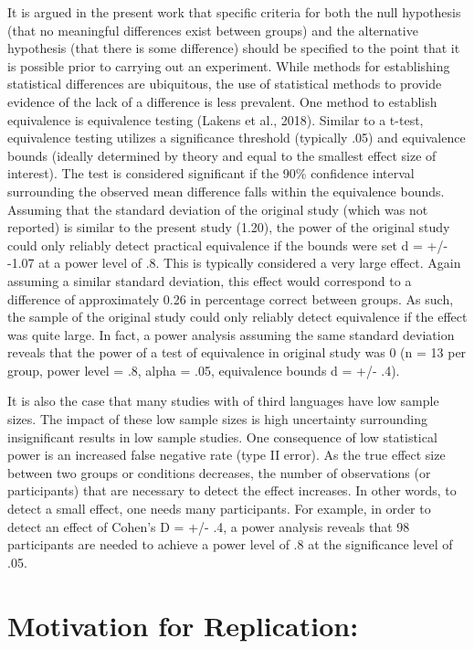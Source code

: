 \documentclass[
  man,floatsintext]{apa6}
\begin{document}
It is argued in the present work that specific criteria for both the null hypothesis (that no meaningful differences exist between groups) and the alternative hypothesis (that there is some difference) should be specified to the point that it is possible prior to carrying out an experiment.
While methods for establishing statistical differences are ubiquitous, the use of statistical methods to provide evidence of the lack of a difference is less prevalent.
One method to establish equivalence is equivalence testing (Lakens et al., 2018).
Similar to a t-test, equivalence testing utilizes a significance threshold (typically .05) and equivalence bounds (ideally determined by theory and equal to the smallest effect size of interest).
The test is considered significant if the 90\% confidence interval surrounding the observed mean difference falls within the equivalence bounds.
Assuming that the standard deviation of the original study (which was not reported) is similar to the present study (1.20), the power of the original study could only reliably detect practical equivalence if the bounds were set d = +/- -1.07 at a power level of .8.
This is typically considered a very large effect.
Again assuming a similar standard deviation, this effect would correspond to a difference of approximately 0.26 in percentage correct between groups.
As such, the sample of the original study could only reliably detect equivalence if the effect was quite large.
In fact, a power analysis assuming the same standard deviation reveals that the power of a test of equivalence in original study was 0 (n = 13 per group, power level = .8, alpha = .05, equivalence bounds d = +/- .4).

It is also the case that many studies with of third languages have low sample sizes.
The impact of these low sample sizes is high uncertainty surrounding insignificant results in low sample studies.
One consequence of low statistical power is an increased false negative rate (type II error).
As the true effect size between two groups or conditions decreases, the number of observations (or participants) that are necessary to detect the effect increases.
In other words, to detect a small effect, one needs many participants.
For example, in order to detect an effect of Cohen's D = +/- .4, a power analysis reveals that 98 participants are needed to achieve a power level of .8 at the significance level of .05.

\hypertarget{motivation-for-replication}{%
\section{Motivation for Replication:}\label{motivation-for-replication}}
\end{document}
